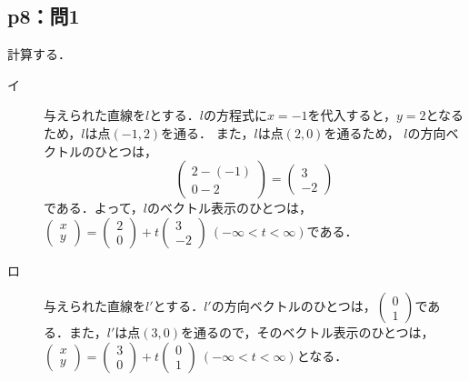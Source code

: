 \documentclass[uplatex,dvipdfmx,a4paper,11pt,fleqn]{jsarticle}
\begin{document}
\newpage

\subsection*{p8：問1}

\begin{tleftbar}
    計算する．
	\begin{description}
        \item[イ] 
    与えられた直線を$l$とする．$l$の方程式に$x=-1$を代入すると，$y=2$となるため，$l$は点$(-1,2)$を通る．
	また，$l$は点$(2,0)$を通るため，
		$l$の方向ベクトルのひとつは，
		\[
        \begin{pmatrix}
            2-(-1)\\
            0-2
        \end{pmatrix} 
        =
            \begin{pmatrix}
                3 \\
                -2
            \end{pmatrix}
            \]
		である．よって，$l$のベクトル表示のひとつは，
		$
		\begin{pmatrix}
			x \\
			y
		\end{pmatrix}
		= 
		\begin{pmatrix}
		2 \\
		0
		\end{pmatrix}
		+t 
			\begin{pmatrix}
				3 \\
				-2
			\end{pmatrix}
			~(-\infty < t < \infty)$である．
			\item[ロ]
            与えられた直線を$l'$とする．$l '$の方向ベクトルのひとつは，$
				\begin{pmatrix}
					0 \\
					1
				\end{pmatrix}
			$である．また，$l '$は点$(3,0)$を通るので，そのベクトル表示のひとつは，
			$
				\begin{pmatrix}
					x \\
					y
				\end{pmatrix}
			= 
				\begin{pmatrix}
				3 \\
				0
				\end{pmatrix}
			+t 
				\begin{pmatrix}
					0 \\
					1
                    \end{pmatrix}
                     ~(-\infty < t < \infty)
				$となる．
                \end{description}
		\end{tleftbar}
		
\end{document}
